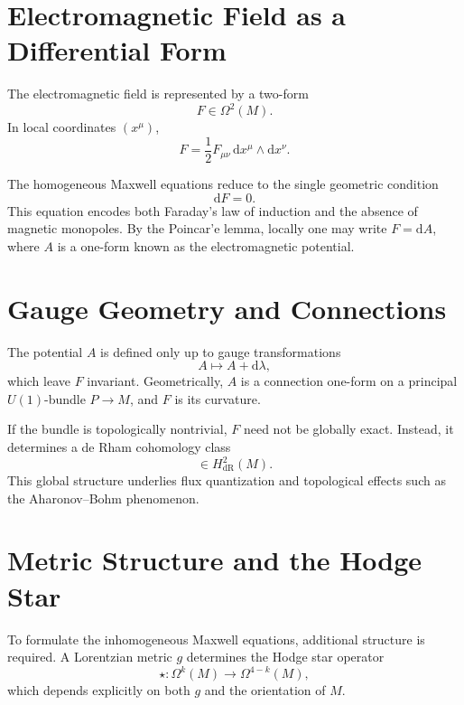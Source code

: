 \documentclass[11pt]{article}
\begin{document}
\section{Electromagnetic Field as a Differential Form}
The electromagnetic field is represented by a two-form
\begin{equation}
F \in \Omega^2(M).
\end{equation}
In local coordinates $(x^\mu)$,
\begin{equation}
F = \frac{1}{2} F_{\mu\nu} \, \mathrm{d}x^\mu \wedge \mathrm{d}x^\nu.
\end{equation}

The homogeneous Maxwell equations reduce to the single geometric condition
\begin{equation}
\mathrm{d}F = 0.
\end{equation}
This equation encodes both Faraday's law of induction and the absence of magnetic monopoles. By the Poincar'e lemma, locally one may write $F = \mathrm{d}A$, where $A$ is a one-form known as the electromagnetic potential.

\section{Gauge Geometry and Connections}
The potential $A$ is defined only up to gauge transformations
\begin{equation}
A \mapsto A + \mathrm{d}\lambda,
\end{equation}
which leave $F$ invariant. Geometrically, $A$ is a connection one-form on a principal $U(1)$-bundle $P \to M$, and $F$ is its curvature.

If the bundle is topologically nontrivial, $F$ need not be globally exact. Instead, it determines a de Rham cohomology class
\begin{equation}
[F] \in H^2_{\mathrm{dR}}(M).
\end{equation}
This global structure underlies flux quantization and topological effects such as the Aharonov--Bohm phenomenon.

\section{Metric Structure and the Hodge Star}
To formulate the inhomogeneous Maxwell equations, additional structure is required. A Lorentzian metric $g$ determines the Hodge star operator
\begin{equation}
\star: \Omega^k(M) \to \Omega^{4-k}(M),
\end{equation}
which depends explicitly on both $g$ and the orientation of $M$.
\end{document}
